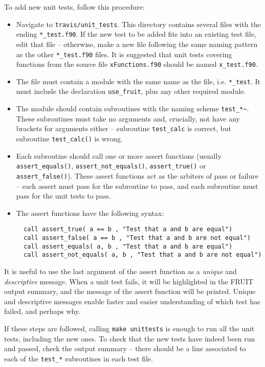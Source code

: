 To add new unit tests, follow this procedure:

\begin{itemize}
\item Navigate to \texttt{travis/unit\_tests}. This directory contains
  several files with the ending \texttt{*\_test.f90}. If the new test
  to be added fits into an existing test file, edit that file --
  otherwise, make a new file following the same naming pattern as the
  other \texttt{*\_test.f90} files. It is suggested that unit tests
  covering functions from the source file \texttt{xFunctions.f90}
  should be named \texttt{x\_test.f90}.
\item The file must contain a module with the same name as the file,
  i.e. \texttt{*\_test}. It must include the declaration
  \verb|use_fruit|, plus any other required module.
\item The module should contain subroutines with the naming scheme
  \texttt{test\_*\textasciitilde}. These subroutines must take no
  arguments and, crucially, not have any brackets for arguments either
  -- subroutine \texttt{test\_calc} is correct, but subroutine
  \texttt{test\_calc()} is wrong.
\item Each subroutine should call one or more assert functions
  (usually \texttt{assert\_equals()}, \texttt{assert\_not\_equals()},
  \texttt{assert\_true()} or \texttt{assert\_false()}). These assert
  functions act as the arbiters of pass or failure -- each assert must
  pass for the subroutine to pass, and each subroutine must pass for
  the unit tests to pass.
\item The assert functions have the following syntax:
  \begin{verbatim}
  call assert_true( a == b , "Test that a and b are equal")
  call assert_false( a == b , "Test that a and b are not equal")
  call assert_equals( a, b , "Test that a and b are equal")
  call assert_not_equals( a, b , "Test that a and b are not equal")
  \end{verbatim}
\end{itemize}

It is useful to use the last argument of the assert function as a
\emph{unique} and \emph{descriptive} message. When a unit test fails,
it will be highlighted in the FRUIT output summary, and the message of
the assert function will be printed. Unique and descriptive messages
enable faster and easier understanding of which test has failed, and
perhaps why.

If these steps are followed, calling \texttt{make\ unittests} is
enough to run all the unit tests, including the new ones. To check
that the new tests have indeed been run and passed, check the output
summary -- there should be a line associated to each of the
\texttt{test\_*} subroutines in each test file.

